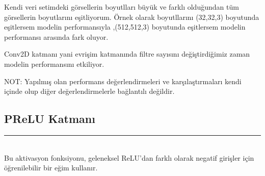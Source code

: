 \documentclass{article}
\begin{document}
\noindent Kendi veri setimdeki görsellerin boyutlları büyük ve farklı olduğundan tüm görsellerin boyutlarını eşitliyorum. Örnek olarak boyutllarını (32,32,3) boyutunda eşitlersem modelin performansıyla ,(512,512,3) boyutunda eşitlersem modelin performansı arasında fark oluyor.

\renewcommand{\tablename}{Tablo}

\begin{table}[h!]
    \centering
    \label{tab:ModelDoğrulukları}
    \caption{Görsel Boyutunun Etkisi}
\end{table}

\newpage
\noindent Conv2D katmanı yani evrişim katmanında filtre sayısını değiştirdiğimiz zaman modelin performansını etkiliyor.


\renewcommand{\tablename}{Tablo}

\begin{table}[h!]
    \centering
    \label{tab:ModelDoğrulukları}
    \caption{Conv2D katmanındaki filtre sayısının Etkisi}
\end{table}

\noindent  NOT: Yapılmış olan performans değerlendirmeleri ve karşılaştırmaları kendi içinde olup diğer değerlendirmelerle bağlantılı değildir.

\subsection{PReLU Katmanı }
\rule{\textwidth}{0.5pt}\\[10pt]

\noindent Bu aktivasyon fonksiyonu, geleneksel ReLU'dan farklı olarak negatif girişler için öğrenilebilir bir eğim kullanır.\\[10pt]
\end{document}
